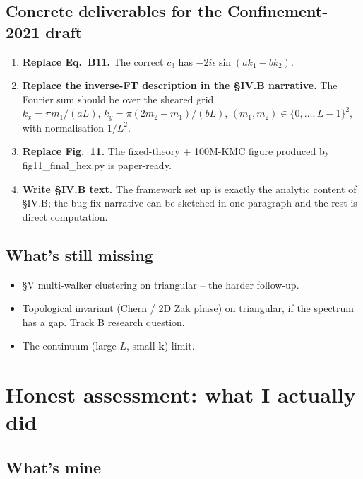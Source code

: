 \documentclass[11pt,a4paper]{article}
\newcommand{\vk}{\mathbf{k}}
\begin{document}
\subsection{Concrete deliverables for the Confinement-2021 draft}\label{ssec:deliverables}

\begin{enumerate}[leftmargin=*]
\item \textbf{Replace Eq.~B11.} The correct $c_3$ has
  $-2 i \epsilon \sin(a k_1 - b k_2)$.
\item \textbf{Replace the inverse-FT description in the §IV.B narrative.}
  The Fourier sum should be over the sheared grid
  $k_x = \pi m_1/(aL),\, k_y = \pi(2 m_2 - m_1)/(b L)$,
  $(m_1, m_2) \in \{0,\dots,L-1\}^2$, with normalisation $1/L^2$.
\item \textbf{Replace Fig.~11.} The fixed-theory + 100M-KMC figure
  produced by {\sf fig11\_final\_hex.py} is paper-ready.
\item \textbf{Write §IV.B text.} The framework set up is exactly the
  analytic content of §IV.B; the bug-fix narrative can be sketched in
  one paragraph and the rest is direct computation.
\end{enumerate}

\subsection{What's still missing}\label{ssec:missing}

\begin{itemize}[leftmargin=*]
\item §V multi-walker clustering on triangular -- the harder follow-up.
\item Topological invariant (Chern / 2D Zak phase) on triangular,
  if the spectrum has a gap. Track B research question.
\item The continuum (large-$L$, small-$\vk$) limit.
\end{itemize}

\section{Honest assessment: what I actually did}\label{sec:honest}

\subsection{What's mine}\label{ssec:mine}
\end{document}
